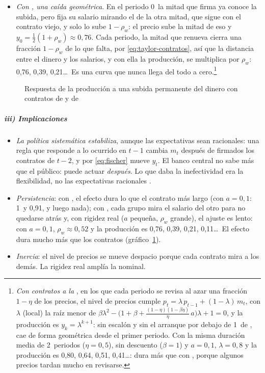 \documentclass[11pt]{article}
\begin{document}
\begin{itemize}
\begin{itemize}
  \item \emph{Con , una caída geométrica}. En el periodo 0~la mitad que firma ya conoce la subida, pero fija su salario mirando el de la otra mitad, que sigue con el contrato viejo, y solo lo sube $1-\rho_w$: el precio sube la mitad de eso y $y_0=\tfrac12(1+\rho_w)\approx0{,}76$. Cada periodo, la mitad que renueva cierra una fracción $1-\rho_w$ de lo que falta, por \eqref{eq:taylor-contratos}, así que la distancia entre el dinero y los salarios, y con ella la producción, se multiplica por $\rho_w$: 0,76, 0,39, 0,21\dots\ Es una curva que nunca llega del todo a cero.\footnote{\emph{Con contratos a la }, en los que cada periodo se revisa al azar una fracción $1-\eta$ de los precios, el nivel de precios cumple $p_t=\lambda\,p_{t-1}+(1-\lambda)\,m_t$, con $\lambda$ (local) la raíz menor de $\beta\lambda^2-\big(1+\beta+\tfrac{(1-\eta)(1-\beta\eta)}{\eta}\,a\big)\lambda+1=0$, y la producción es $y_k=\lambda^{k+1}$: sin escalón y sin el arranque por debajo de 1~de , cae de forma geométrica desde el primer periodo. Con la misma duración media de 2~periodos ($\eta=0{,}5$), sin descuento ($\beta=1$) y $a=0{,}1$, $\lambda=0{,}8$ y la producción es 0,80, 0,64, 0,51, 0,41\dots: dura más que con , porque algunos precios tardan mucho en revisarse\nocite{Calvo1983Staggered,Romer2019Advanced}.}
  \end{itemize}
\end{itemize}

\begin{figure}[H]
\centering
\caption{Respuesta de la producción a una subida permanente del dinero con contratos de  y de }\label{fig:fischer-taylor}
\end{figure}

\subparagraph{iii) Implicaciones}
\begin{itemize}
\item \emph{La política sistemática estabiliza}, aunque las expectativas sean racionales: una regla que responde a lo ocurrido en $t-1$ cambia $m_t$ después de firmados los contratos de $t-2$, y por \eqref{eq:fischer} mueve $y_t$. El banco central no sabe más que el público: puede actuar \emph{después}. Lo que daba la inefectividad era la flexibilidad, no las expectativas racionales .
\item \emph{Persistencia}: con , el efecto dura lo que el contrato más largo (con $a=0{,}1$: 1~y 0,91, y luego nada); con , cada grupo mira el salario del otro para no quedarse atrás y, con rigidez real ($a$ pequeña, $\rho_w$ grande), el ajuste es lento: con $a=0{,}1$, $\rho_w\approx0{,}52$ y la producción es 0,76, 0,39, 0,21, 0,11\dots\ El efecto dura mucho más que los contratos (gráfico~\ref{fig:fischer-taylor}).
\item \emph{Inercia}: el nivel de precios se mueve despacio porque cada contrato mira a los demás. La rigidez real amplía la nominal.
\end{itemize}
\end{document}
